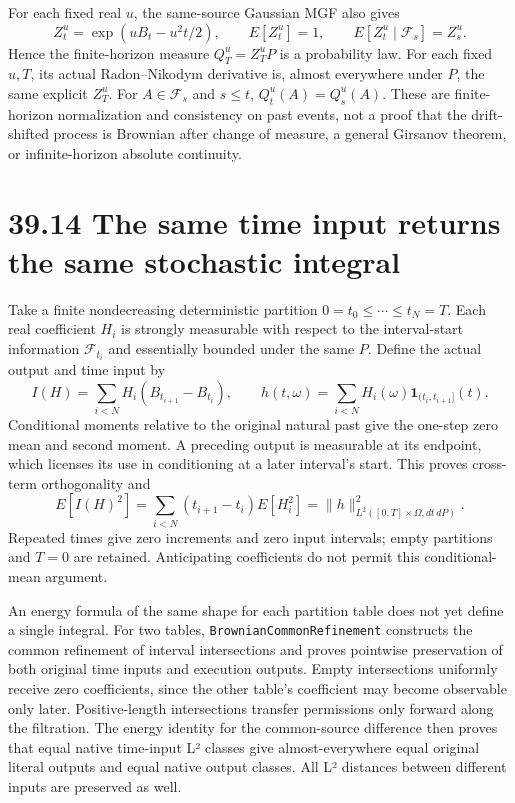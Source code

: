 \documentclass[
  english,
  11pt,
  oneside]{book}
\begin{document}
For each fixed real \(u\), the same-source Gaussian MGF also gives \[Z_t^u=\exp(uB_t-u^2t/2),\qquad E[Z_t^u]=1,
\qquad E[Z_t^u\mid\mathcal F_s]=Z_s^u.\] Hence the finite-horizon measure \(Q_T^u=Z_T^uP\) is a probability law. For each fixed \(u,T\), its actual Radon--Nikodym derivative is, almost everywhere under \(P\), the same explicit \(Z_T^u\). For \(A\in\mathcal F_s\) and \(s\le t\), \(Q_t^u(A)=Q_s^u(A)\). These are finite-horizon normalization and consistency on past events, not a proof that the drift-shifted process is Brownian after change of measure, a general Girsanov theorem, or infinite-horizon absolute continuity.

\section{39.14 The same time input returns the same stochastic integral}\label{the-same-time-input-returns-the-same-stochastic-integral}

Take a finite nondecreasing deterministic partition \(0=t_0\le\cdots\le t_N=T\). Each real coefficient \(H_i\) is strongly measurable with respect to the interval-start information \(\mathcal F_{t_i}\) and essentially bounded under the same \(P\). Define the actual output and time input by \[I(H)=\sum_{i<N}H_i(B_{t_{i+1}}-B_{t_i}),\qquad
h(t,\omega)=\sum_{i<N}H_i(\omega)\mathbf1_{(t_i,t_{i+1}]}(t).\] Conditional moments relative to the original natural past give the one-step zero mean and second moment. A preceding output is measurable at its endpoint, which licenses its use in conditioning at a later interval's start. This proves cross-term orthogonality and \[E[I(H)^2]=\sum_{i<N}(t_{i+1}-t_i)E[H_i^2]
=\|h\|_{L^2([0,T]\times\Omega,dt\,dP)}^2.\] Repeated times give zero increments and zero input intervals; empty partitions and \(T=0\) are retained. Anticipating coefficients do not permit this conditional-mean argument.

An energy formula of the same shape for each partition table does not yet define a single integral. For two tables, \nolinkurl{BrownianCommonRefinement} constructs the common refinement of interval intersections and proves pointwise preservation of both original time inputs and execution outputs. Empty intersections uniformly receive zero coefficients, since the other table's coefficient may become observable only later. Positive-length intersections transfer permissions only forward along the filtration. The energy identity for the common-source difference then proves that equal native time-input L² classes give almost-everywhere equal original literal outputs and equal native output classes. All L² distances between different inputs are preserved as well.
\end{document}
